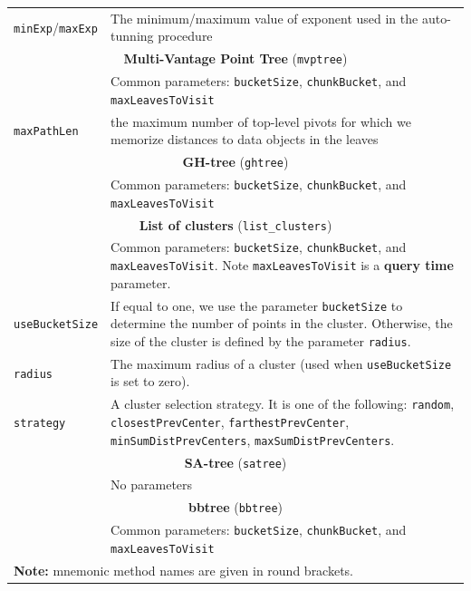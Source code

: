 \documentclass[runningheads,a4paper]{llncs}
\newcommand{\ttt}[1]{\texttt{#1}}
\begin{document}
{\begin{table}
\begin{tabular}{l@{\hspace{2mm}}p{3.5in}}
 \ttt{minExp}/\ttt{maxExp} & The minimum/maximum value of exponent used in the auto-tunning procedure \\
\cmidrule(l){1-2} 
\multicolumn{2}{c}{\textbf{Multi-Vantage Point Tree} (\ttt{mvptree})  \cite{bozkaya1999indexing}}   \\
\cmidrule(l){1-2} 
                   & Common parameters: \ttt{bucketSize}, \ttt{chunkBucket}, and \ttt{maxLeavesToVisit} \\
 \ttt{maxPathLen}  & the maximum number of top-level pivots for which we memorize distances
to data objects in the leaves \\
\cmidrule(l){1-2} 
\multicolumn{2}{c}{\textbf{GH-tree} (\ttt{ghtree})  \cite{Uhlmann:1991}}   \\
\cmidrule(l){1-2} 
                   & Common parameters: \ttt{bucketSize}, \ttt{chunkBucket}, and \ttt{maxLeavesToVisit} \\
\cmidrule(l){1-2} 
\multicolumn{2}{c}{\textbf{List of clusters} (\ttt{list\_clusters})  \cite{chavez2005compact}}   \\
\cmidrule(l){1-2} 
                   & Common parameters: \ttt{bucketSize}, \ttt{chunkBucket}, and \ttt{maxLeavesToVisit}. Note \ttt{maxLeavesToVisit} is a \textbf{query time} parameter. \\
\ttt{useBucketSize} & If equal to one, we use the parameter \ttt{bucketSize} to determine the number of points in the cluster. Otherwise, the size of the cluster is defined by the parameter \ttt{radius}. \\
\ttt{radius}        & The maximum radius of a cluster (used when \ttt{useBucketSize} is set to zero). \\
\ttt{strategy}      & A cluster selection strategy. It is one of the following: \ttt{random}, \ttt{closestPrevCenter}, \ttt{farthestPrevCenter}, \ttt{minSumDistPrevCenters}, \ttt{maxSumDistPrevCenters}. \\ 
\cmidrule(l){1-2} 
\multicolumn{2}{c}{\textbf{SA-tree} (\ttt{satree})  \cite{navarro2002searching}}   \\
\cmidrule(l){1-2} 
                   & No parameters \\
\cmidrule(l){1-2} 
\multicolumn{2}{c}{\textbf{bbtree} (\ttt{bbtree})  \cite{Cayton2008}}   \\
\cmidrule(l){1-2} 
                   & Common parameters: \ttt{bucketSize}, \ttt{chunkBucket}, and \ttt{maxLeavesToVisit} \\
\bottomrule
\multicolumn{2}{l}{\textbf{Note:} mnemonic method names are given in round brackets.}
\end{tabular}
\vspace{2em}
\end{table}

}
\end{document}
